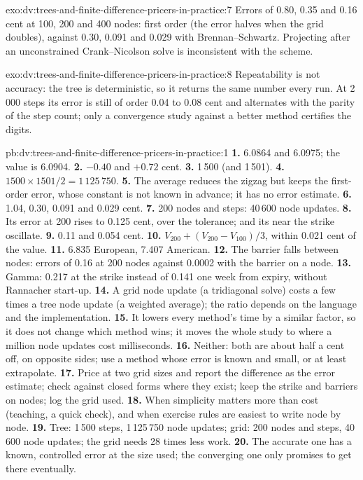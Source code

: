 \begin{solution}{exo:dv:trees-and-finite-difference-pricers-in-practice:7}
Errors of 0.80, 0.35 and 0.16 cent at 100, 200 and 400 nodes: first order (the error halves when the grid doubles), against 0.30, 0.091 and 0.029 with
Brennan--Schwartz. Projecting after an unconstrained Crank--Nicolson solve is inconsistent with the scheme.
\end{solution}

\begin{solution}{exo:dv:trees-and-finite-difference-pricers-in-practice:8}
Repeatability is not accuracy: the tree is deterministic, so it returns the same number every run. At 2\,000 steps its error is still of order 0.04 to
0.08 cent and alternates with the parity of the step count; only a convergence study against a better method certifies the digits.
\end{solution}

\begin{solution}{pb:dv:trees-and-finite-difference-pricers-in-practice:1}
\textbf{1.} 6.0864 and 6.0975; the value is 6.0904.
\textbf{2.} $-0.40$ and $+0.72$ cent.
\textbf{3.} 1\,500 (and 1\,501).
\textbf{4.} $1500\times1501/2=1\,125\,750$.
\textbf{5.} The average reduces the zigzag but keeps the first-order error, whose constant is not known in advance; it has no error estimate.
\textbf{6.} 1.04, 0.30, 0.091 and 0.029 cent.
\textbf{7.} 200 nodes and steps: 40\,600 node updates.
\textbf{8.} Its error at 200 rises to 0.125 cent, over the tolerance; and its  near the strike oscillate.
\textbf{9.} 0.11 and 0.054 cent.
\textbf{10.} $V_{200}+(V_{200}-V_{100})/3$, within 0.021 cent of the value.
\textbf{11.} 6.835 European, 7.407 American.
\textbf{12.} The barrier falls between nodes: errors of 0.16 at 200 nodes against 0.0002 with the barrier on a node.
\textbf{13.} Gamma: 0.217 at the strike instead of 0.141 one week from expiry, without Rannacher start-up.
\textbf{14.} A grid node update (a tridiagonal solve) costs a few times a tree node update (a weighted average); the ratio depends on the language and the
implementation.
\textbf{15.} It lowers every method's time by a similar factor, so it does not change which method wins; it moves the whole study to where a million node
updates cost milliseconds.
\textbf{16.} Neither: both are about half a cent off, on opposite sides; use a method whose error is known and small, or at least extrapolate.
\textbf{17.} Price at two grid sizes and report the difference as the error estimate; check against closed forms where they exist; keep the strike and
barriers on nodes; log the grid used.
\textbf{18.} When simplicity matters more than cost (teaching, a quick check), and when exercise rules are easiest to write node by node.
\textbf{19.} Tree: 1\,500 steps, 1\,125\,750 node updates; grid: 200 nodes and steps, 40\,600 node updates; the grid needs 28 times less work.
\textbf{20.} The accurate one has a known, controlled error at the size used; the converging one only promises to get there eventually.
\end{solution}

